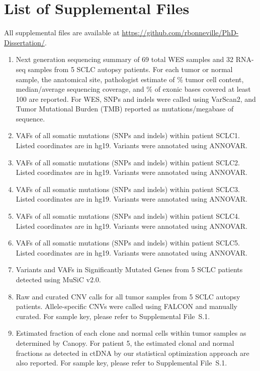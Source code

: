 \section{List of Supplemental Files}
All supplemental files are available at \url{https://github.com/rbonneville/PhD-Dissertation/}.
\begin{enumerate}
    \renewcommand*{\labelenumi}{S\thechapter{}.\arabic{enumi}. }
    \item Next generation sequencing summary of 69 total WES samples and 32 RNA-seq samples from 5 SCLC autopsy patients. For each tumor or normal sample, the anatomical site, pathologist estimate of \% tumor cell content, median/average sequencing coverage, and \% of exonic bases covered at least 100\texttimes{} are reported. For WES, SNPs and indels were called using VarScan2, and Tumor Mutational Burden (TMB) reported as mutations/megabase of sequence.
    \item VAFs of all somatic mutations (SNPs and indels) within patient SCLC1\@. Listed coordinates are in hg19. Variants were annotated using ANNOVAR\@.
    \item VAFs of all somatic mutations (SNPs and indels) within patient SCLC2\@. Listed coordinates are in hg19. Variants were annotated using ANNOVAR\@.
    \item VAFs of all somatic mutations (SNPs and indels) within patient SCLC3\@. Listed coordinates are in hg19. Variants were annotated using ANNOVAR\@.
    \item VAFs of all somatic mutations (SNPs and indels) within patient SCLC4\@. Listed coordinates are in hg19. Variants were annotated using ANNOVAR\@.
    \item VAFs of all somatic mutations (SNPs and indels) within patient SCLC5\@. Listed coordinates are in hg19. Variants were annotated using ANNOVAR\@.
    \item Variants and VAFs in Significantly Mutated Genes from 5 SCLC patients detected using MuSiC v2.0.
    \item Raw and curated CNV calls for all tumor samples from 5 SCLC autopsy patients. Allele-specific CNVs were called using FALCON and manually curated. For sample key, please refer to Supplemental File~S\thechapter{}.1.
    \item Estimated fraction of each clone and normal cells within tumor samples as determined by Canopy. For patient 5, the estimated clonal and normal fractions as detected in ctDNA by our statistical optimization approach are also reported. For sample key, please refer to Supplemental File~S\thechapter{}.1.

\end{enumerate}
